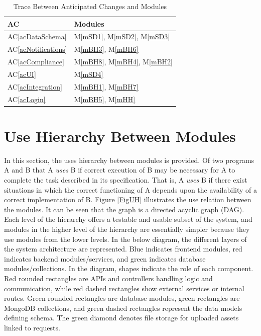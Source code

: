 \documentclass[12pt, titlepage]{article}
\newcommand{\acref}[1]{AC\ref{#1}}
\newcommand{\mref}[1]{M\ref{#1}}
\begin{document}
\begin{table}[H]
\centering
\begin{tabular}{p{} p{}}
\toprule
\textbf{AC} & \textbf{Modules}\\
\midrule
\acref{acDataSchema} & \mref{mSD1}, \mref{mSD2}, \mref{mSD3}\\
\acref{acNotifications} & \mref{mBH3}, \mref{mBH6}\\
\acref{acCompliance} & \mref{mBH8}, \mref{mBH4}, \mref{mBH2}\\
\acref{acUI} & \mref{mSD4}\\
\acref{acIntegration} & \mref{mBH1}, \mref{mBH7}\\
\acref{acLogin} & \mref{mBH5}, \mref{mHH}\\
\bottomrule
\end{tabular}
\caption{Trace Between Anticipated Changes and Modules}
\label{TblACT}
\end{table}

\newpage

\section{Use Hierarchy Between Modules} \label{SecUse}

In this section, the uses hierarchy between modules is
provided. Of two programs A and B that A {\em uses} B if
correct execution of B may be necessary for A to complete the task described in
its specification. That is, A {\em uses} B if there exist situations in which
the correct functioning of A depends upon the availability of a correct
implementation of B.  Figure \ref{FigUH} illustrates the use relation between
the modules. It can be seen that the graph is a directed acyclic graph
(DAG). Each level of the hierarchy offers a testable and usable subset of the
system, and modules in the higher level of the hierarchy are essentially simpler because they use modules from the lower levels. In the below diagram, the different layers of the system architecture are represented. Blue indicates frontend modules, red indicates backend modules/services, and green indicates database modules/collections. In the diagram, shapes indicate the role of each component. Red rounded rectangles are APIs and controllers handling logic and communication, while red dashed rectangles show external services or internal routes. Green rounded rectangles are database modules, green rectangles are MongoDB collections, and green dashed rectangles represent the data models defining schema. The green diamond denotes file storage for uploaded assets linked to requests.
\end{document}
